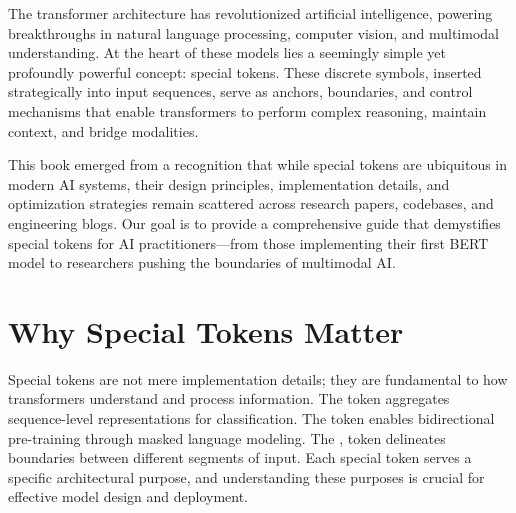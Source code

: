 The transformer architecture has revolutionized artificial intelligence, powering breakthroughs in natural language processing, computer vision, and multimodal understanding. At the heart of these models lies a seemingly simple yet profoundly powerful concept: special tokens. These discrete symbols, inserted strategically into input sequences, serve as anchors, boundaries, and control mechanisms that enable transformers to perform complex reasoning, maintain context, and bridge modalities.
\begin{comment}
Feedback: This is a strong opening. To make it even better, consider adding a very specific, impressive example of what a special token enables. For instance, "...enable transformers to distinguish between a question and its context, or even to generate computer code." This could make the abstract concepts more concrete for the reader from the very beginning.
\end{comment}

This book emerged from a recognition that while special tokens are ubiquitous in modern AI systems, their design principles, implementation details, and optimization strategies remain scattered across research papers, codebases, and engineering blogs. Our goal is to provide a comprehensive guide that demystifies special tokens for AI practitioners---from those implementing their first BERT model to researchers pushing the boundaries of multimodal AI.

\section*{Why Special Tokens Matter}

Special tokens are not mere implementation details; they are fundamental to how transformers understand and process information. The \cls{} token aggregates sequence-level representations for classification. The \mask{} token enables bidirectional pre-training through masked language modeling. The \sep{} token delineates boundaries between different segments of input. Each special token serves a specific architectural purpose, and understanding these purposes is crucial for effective model design and deployment.
\begin{comment}
Feedback: This paragraph is good at defining the "what." To avoid it feeling like a list of definitions, you could add a sentence or two about the "why." For example, after explaining the tokens, you could add something like: "Without these explicit markers, a transformer would face a much harder task of inferring structure from a flat sequence of data, leading to slower training and less accurate models." This emphasizes the problem they solve.
\end{comment}

